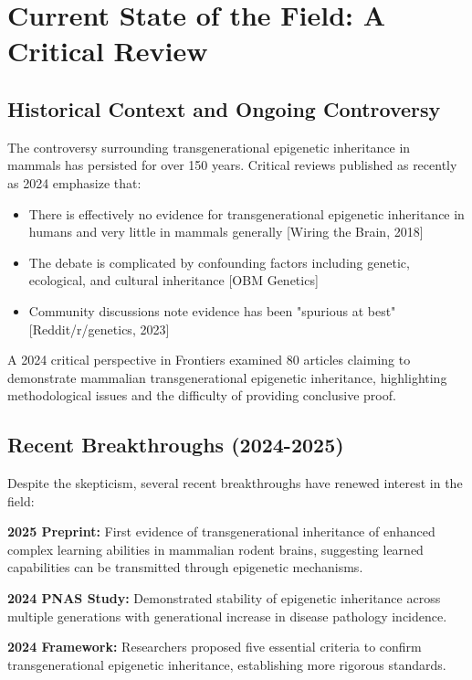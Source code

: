 \documentclass[12pt,twoside]{article}
\begin{document}
\section{Current State of the Field: A Critical Review}

\subsection{Historical Context and Ongoing Controversy}

The controversy surrounding transgenerational epigenetic inheritance in mammals has persisted for over 150 years. Critical reviews published as recently as 2024 emphasize that:

\begin{itemize}
    \item There is effectively no evidence for transgenerational epigenetic inheritance in humans and very little in mammals generally [Wiring the Brain, 2018]
    \item The debate is complicated by confounding factors including genetic, ecological, and cultural inheritance [OBM Genetics]
    \item Community discussions note evidence has been "spurious at best" [Reddit/r/genetics, 2023]
\end{itemize}

A 2024 critical perspective in Frontiers examined 80 articles claiming to demonstrate mammalian transgenerational epigenetic inheritance, highlighting methodological issues and the difficulty of providing conclusive proof.

\subsection{Recent Breakthroughs (2024-2025)}

Despite the skepticism, several recent breakthroughs have renewed interest in the field:

\textbf{2025 Preprint:} First evidence of transgenerational inheritance of enhanced complex learning abilities in mammalian rodent brains, suggesting learned capabilities can be transmitted through epigenetic mechanisms.

\textbf{2024 PNAS Study:} Demonstrated stability of epigenetic inheritance across multiple generations with generational increase in disease pathology incidence.

\textbf{2024 Framework:} Researchers proposed five essential criteria to confirm transgenerational epigenetic inheritance, establishing more rigorous standards.
\end{document}
